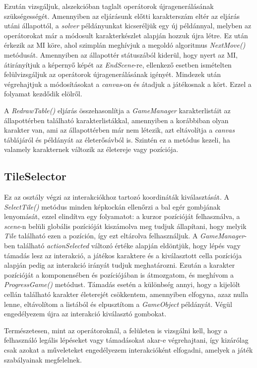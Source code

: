 \documentclass[
]{thesis-ekf}
\theoremstyle{definition}
\theoremstyle{remark}
\begin{document}
Ezután vizsgáljuk,  alszekcióban taglalt operátorok újragenerálásának szükségességét. Amennyiben az eljárásunk előtti karakterszám eltér az eljárás utáni állapottól, a \emph{solver} példányunkat kicseréljük egy új példánnyal, melyben az operátorokat már a módosult karakterkészlet alapján hozzuk újra létre. Ez után érkezik az MI köre, ahol szimplán meghívjuk a megoldó algoritmus \emph{NextMove()} metódusát. Amennyiben az állapottér státuszából kiderül, hogy nyert az MI, átirányítjuk a képernyő képét az \emph{EndScene}-re, ellenkező esetben ismételten felülvizsgáljuk az operátorok újragenerálásának igényét. Mindezek után végrehajtjuk a módosításokat a \emph{canvas}-on és átadjuk a játékosnak a kört. Ezzel a folyamat kezdődik elölről.

A \emph{RedrawTable()} eljárás összehasonlítja a \emph{GameManager} karakterlistáit az állapottérben található karakterlistákkal, amennyiben a korábbiban olyan karakter van, ami az állapottérben már nem létezik, azt eltávolítja a \emph{canvas} táblájáról és példányát az életerősávból is. Szintén ez a metódus kezeli, ha valamely karakternek változik az életereje vagy pozíciója.

\subsection{TileSelector} \label{tileselector}

Ez az osztály végzi az interakciókhoz tartozó koordináták kiválasztását. A \emph{SelectTile()} metódus minden képkockán ellenőrzi a bal egér gombjának lenyomását, ezzel elindítva egy folyamatot: a kurzor pozícióját felhasználva, a \emph{scene}-n belüli globális pozícióját kiszámolva meg tudjuk állapítani, hogy melyik \emph{Tile} található ezen a pozíción, így ezt eltárolva felhasználjuk. A \emph{GameManager}-ben található \emph{actionSelected} változó értéke alapján eldöntjük, hogy lépés vagy támadás lesz az interakció, a játékos karaktere és a kiválasztott cella pozíciója alapján pedig az interakció irányát tudjuk meghatározni. Ezután a karakter pozícióját a komponensében és pozíciójában is átmozgatom, és meghívom a \emph{ProgressGame()} metódust. Támadás esetén a különbség annyi, hogy a kijelölt cellán található karakter életerejét csökkentem, amennyiben elfogyna, azaz nulla lenne, eltávolítom a listából és elpusztítom a \emph{GameObject} példányát. Végül engedélyezem újra az interakció kiválasztó gombokat.

Természetesen, mint az operátoroknál, a felületen is vizsgálni kell, hogy a felhasználó legális lépéseket vagy támadásokat akar-e végrehajtani, így kizárólag csak azokat a műveleteket engedélyezem interakcióként elfogadni, amelyek a játék szabályainak megfelelnek.
\end{document}
